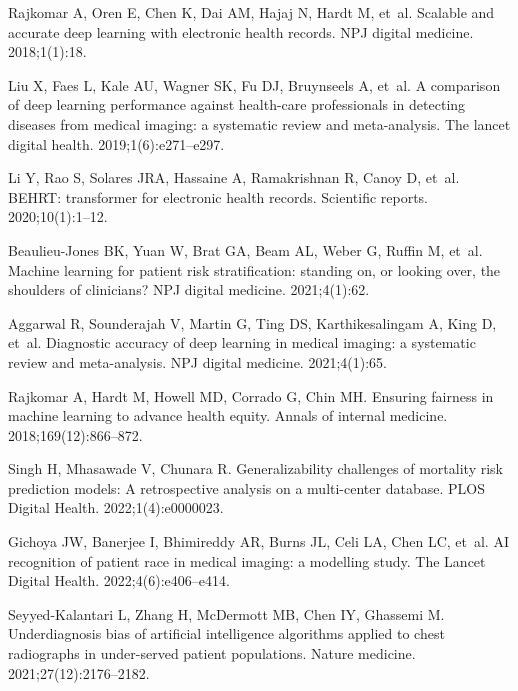 \documentclass[10pt,letterpaper]{article}
\begin{document}
\begin{thebibliography}{100}

  Rajkomar A, Oren E, Chen K, Dai AM, Hajaj N, Hardt M, et~al.
  \newblock Scalable and accurate deep learning with electronic health records.
  \newblock NPJ digital medicine. 2018;1(1):18.

  Liu X, Faes L, Kale AU, Wagner SK, Fu DJ, Bruynseels A, et~al.
  \newblock A comparison of deep learning performance against health-care professionals in detecting diseases from medical imaging: a systematic review and meta-analysis.
  \newblock The lancet digital health. 2019;1(6):e271--e297.

  Li Y, Rao S, Solares JRA, Hassaine A, Ramakrishnan R, Canoy D, et~al.
  \newblock BEHRT: transformer for electronic health records.
  \newblock Scientific reports. 2020;10(1):1--12.

  Beaulieu-Jones BK, Yuan W, Brat GA, Beam AL, Weber G, Ruffin M, et~al.
  \newblock Machine learning for patient risk stratification: standing on, or looking over, the shoulders of clinicians?
  \newblock NPJ digital medicine. 2021;4(1):62.

  Aggarwal R, Sounderajah V, Martin G, Ting DS, Karthikesalingam A, King D, et~al.
  \newblock Diagnostic accuracy of deep learning in medical imaging: a systematic review and meta-analysis.
  \newblock NPJ digital medicine. 2021;4(1):65.

  Rajkomar A, Hardt M, Howell MD, Corrado G, Chin MH.
  \newblock Ensuring fairness in machine learning to advance health equity.
  \newblock Annals of internal medicine. 2018;169(12):866--872.

  Singh H, Mhasawade V, Chunara R.
  \newblock Generalizability challenges of mortality risk prediction models: A retrospective analysis on a multi-center database.
  \newblock PLOS Digital Health. 2022;1(4):e0000023.

  Gichoya JW, Banerjee I, Bhimireddy AR, Burns JL, Celi LA, Chen LC, et~al.
  \newblock AI recognition of patient race in medical imaging: a modelling study.
  \newblock The Lancet Digital Health. 2022;4(6):e406--e414.

  Seyyed-Kalantari L, Zhang H, McDermott MB, Chen IY, Ghassemi M.
  \newblock Underdiagnosis bias of artificial intelligence algorithms applied to chest radiographs in under-served patient populations.
  \newblock Nature medicine. 2021;27(12):2176--2182.


\end{thebibliography}
\end{document}
